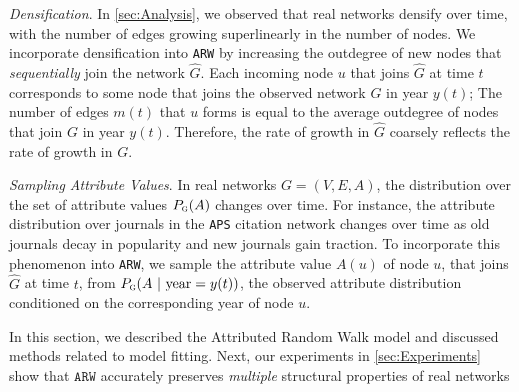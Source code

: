 \textit{Densification}. In \cref{sec:Analysis}, we observed that real
networks densify over time, with the number of edges growing superlinearly in
the number of nodes. We incorporate densification into \texttt{ARW} by
increasing the outdegree of new nodes that \textit{sequentially} join the
network $\hat{G}$.
Each incoming node $u$ that joins $\hat{G}$ at time $t$ corresponds to some
 node that joins the observed network $G$ in
year $y(t)$; The number of edges $m(t)$ that $u$ forms is equal to the average
outdegree of nodes that join $G$ in year $y(t)$. Therefore, the rate of growth
in $\hat{G}$ coarsely reflects the rate of growth in $G$.

\textit{Sampling Attribute Values}. In real networks $G=(V,E,A)$,
the distribution over the set of attribute values $P_{\textsc{g}}(A)$ changes over time.
For instance, the attribute distribution over journals in the \texttt{APS} citation
network changes over time as old journals decay in popularity and new journals gain traction.
To incorporate this phenomenon into \texttt{ARW}, we sample the attribute value $A(u)$ of node $u$, that
joins $\hat{G}$ at time $t$, from $P_{\textsc{g}}(A{\mbox{ | year}=y(t)})$, the observed attribute distribution
conditioned on the corresponding year of node $u$.


In this section, we described the Attributed Random Walk
model and discussed methods related to model fitting. Next, our experiments in
\cref{sec:Experiments} show that $\texttt{ARW}$ accurately preserves
\textit{multiple} structural properties of real networks



